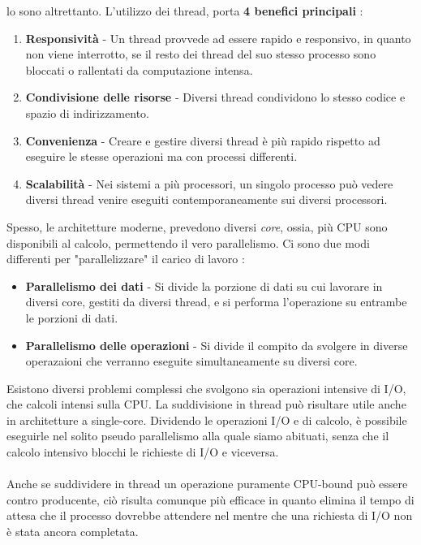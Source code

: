 \documentclass[12pt, letterpaper]{article}
\newcommand{\acc}{\\\hphantom{}\\}
\begin{document}
lo sono altrettanto. L'utilizzo dei thread, porta \textbf{4 benefici principali} : \begin{enumerate}
    \item \textbf{Responsività} - Un thread provvede ad essere rapido e responsivo, in quanto non viene interrotto, se il resto 
    dei thread del suo stesso processo sono bloccati o rallentati da computazione intensa.
    \item \textbf{Condivisione delle risorse} - Diversi thread condividono lo stesso codice e spazio di indirizzamento.
    \item \textbf{Convenienza} - Creare e gestire diversi thread è più rapido rispetto ad eseguire le stesse operazioni ma con 
    processi differenti. 
    \item \textbf{Scalabilità} - Nei sistemi a più processori, un singolo processo può vedere diversi thread venire 
    eseguiti contemporaneamente sui diversi processori.
\end{enumerate}
Spesso, le architetture moderne, prevedono diversi \textit{core}, ossia, più CPU sono disponibili al calcolo, 
permettendo il vero parallelismo. Ci sono due modi differenti per "parallelizzare" il carico di lavoro :\begin{itemize}
    \item \textbf{Parallelismo dei dati} - Si divide la porzione di dati su cui lavorare in diversi core, gestiti 
    da diversi thread, e si performa l'operazione su entrambe le porzioni di dati.
    \item \textbf{Parallelismo delle operazioni} - Si divide il compito da svolgere in diverse operazaioni che verranno 
    eseguite simultaneamente su diversi core.
\end{itemize}
Esistono diversi problemi complessi che svolgono sia operazioni intensive di I/O, che calcoli 
intensi sulla CPU. La suddivisione in thread può risultare utile anche in architetture a single-core. Dividendo le operazioni 
I/O e di calcolo, è possibile eseguirle nel solito pseudo parallelismo alla quale siamo abituati, senza che 
il calcolo intensivo blocchi le richieste di I/O e viceversa. \acc Anche se suddividere in thread un operazione 
puramente CPU-bound può essere contro producente, ciò risulta comunque più efficace in quanto elimina il tempo di attesa 
che il processo dovrebbe attendere nel mentre che una richiesta di I/O non è stata ancora completata.
\end{document}
